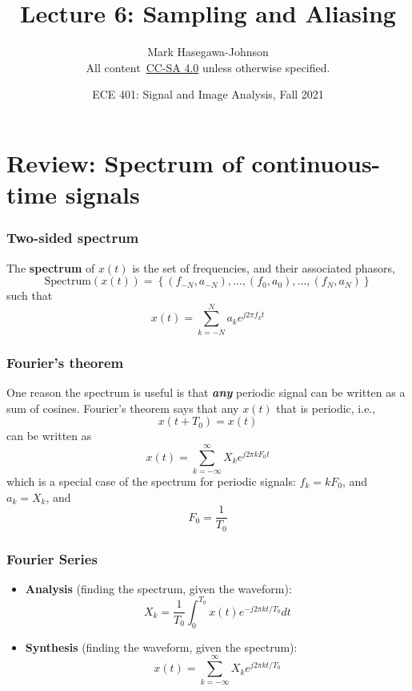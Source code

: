 \documentclass{beamer}
\title{Lecture 6: Sampling and Aliasing}
\author{Mark Hasegawa-Johnson\\All content~\href{https://creativecommons.org/licenses/by-sa/4.0/}{CC-SA 4.0} unless otherwise specified.}
\date{ECE 401: Signal and Image Analysis, Fall 2021}
\begin{document}
\begin{frame}
  \maketitle
\end{frame}

\begin{frame}
  \tableofcontents
\end{frame}

\section[Review]{Review: Spectrum of continuous-time signals}
\setcounter{subsection}{1}

\begin{frame}
  \frametitle{Two-sided spectrum}

  The {\bf spectrum} of $x(t)$ is the set of frequencies, and their
  associated phasors,
  \[
  \mbox{Spectrum}\left( x(t) \right) =
  \left\{ (f_{-N},a_{-N}), \ldots, (f_0,a_0), \ldots, (f_N,a_N) \right\}
  \]
  such that
  \[
  x(t) = \sum_{k=-N}^N a_ke^{j2\pi f_kt}
  \]
\end{frame}

\begin{frame}
  \frametitle{Fourier's theorem}

  One reason the spectrum is useful is that {\bf\em any} periodic
  signal can be written as a sum of cosines.  Fourier's theorem says that
  any $x(t)$ that is periodic, i.e.,
  \[
  x(t+T_0) = x(t)
  \]
  can be written as
  \[
  x(t) = \sum_{k=-\infty}^\infty X_k e^{j2\pi k F_0 t}
  \]
  which is a special case of the spectrum for periodic signals:
  $f_k=kF_0$, and $a_k=X_k$, and
  \[
  F_0 = \frac{1}{T_0}
  \]
\end{frame}

\begin{frame}
  \frametitle{Fourier Series}

  \begin{itemize}
  \item {\bf Analysis}  (finding the spectrum, given the waveform):
    \[
    X_k = \frac{1}{T_0}\int_0^{T_0} x(t)e^{-j2\pi kt/T_0}dt
    \]
  \item {\bf Synthesis} (finding the waveform, given the spectrum):
    \[
    x(t) = \sum_{k=-\infty}^\infty X_k e^{j2\pi kt/T_0}
    \]
  \end{itemize}
\end{frame}  
\end{document}
